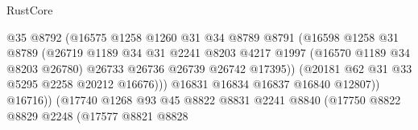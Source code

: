 \begin{lexlean}{RustCore}
\begin{coremodule}
                                              @35
                                              @8792
                                              (@16575
                                                @1258
                                                @1260
                                                @31
                                                @34
                                                @8789
                                                @8791
                                                (@16598
                                                  @1258
                                                  @31
                                                  @8789
                                                  (@26719
                                                    @1189
                                                    @34
                                                    @31
                                                    @2241
                                                    @8203
                                                    @4217
                                                    @1997
                                                    (@16570 @1189 @34 @8203 @26780)
                                                    @26733
                                                    @26736
                                                    @26739
                                                    @26742
                                                    @17395))
                                                (@20181 @62 @31 @33 @5295 @2258 @20212 @16676)))
                                            @16831
                                            @16834
                                            @16837
                                            @16840
                                            @12807))
                                        @16716))
                                    (@17740
                                      @1268
                                      @93
                                      @45
                                      @8822
                                      @8831
                                      @2241
                                      @8840
                                      (@17750
                                        @8822
                                        @8829
                                        @2248
                                        (@17577
                                          @8821
                                          @8828

\end{coremodule}
\end{lexlean}
